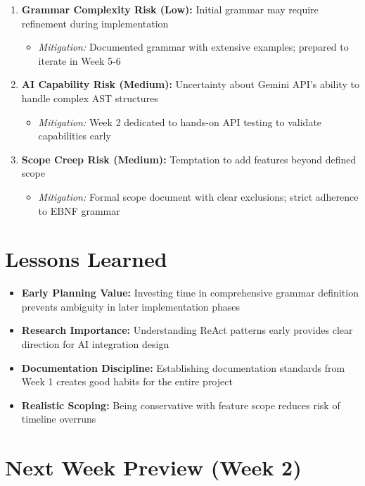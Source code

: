 \documentclass[a4paper,11pt]{article}
\begin{document}
\begin{enumerate}
    \item \textbf{Grammar Complexity Risk (Low):} Initial grammar may require refinement during implementation
    \begin{itemize}
        \item \textit{Mitigation:} Documented grammar with extensive examples; prepared to iterate in Week 5-6
    \end{itemize}
    
    \item \textbf{AI Capability Risk (Medium):} Uncertainty about Gemini API's ability to handle complex AST structures
    \begin{itemize}
        \item \textit{Mitigation:} Week 2 dedicated to hands-on API testing to validate capabilities early
    \end{itemize}
    
    \item \textbf{Scope Creep Risk (Medium):} Temptation to add features beyond defined scope
    \begin{itemize}
        \item \textit{Mitigation:} Formal scope document with clear exclusions; strict adherence to EBNF grammar
    \end{itemize}
\end{enumerate}

\section{Lessons Learned}

\begin{itemize}[leftmargin=*]
    \item \textbf{Early Planning Value:} Investing time in comprehensive grammar definition prevents ambiguity in later implementation phases
    \item \textbf{Research Importance:} Understanding ReAct patterns early provides clear direction for AI integration design
    \item \textbf{Documentation Discipline:} Establishing documentation standards from Week 1 creates good habits for the entire project
    \item \textbf{Realistic Scoping:} Being conservative with feature scope reduces risk of timeline overruns
\end{itemize}

\section{Next Week Preview (Week 2)}
\end{document}
